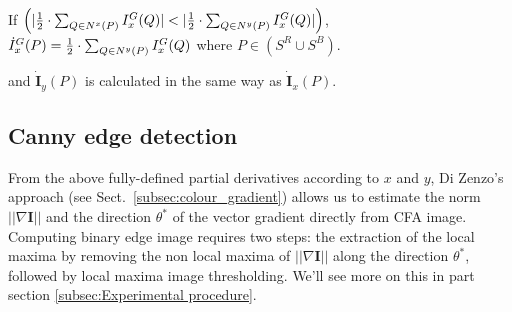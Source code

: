 \documentclass[twoside]{article}
\begin{document}
		
		If $\left(|\frac{1}{2}\cdot\sum_{Q \in \N{x}(P)} I^G_x(Q)|<|\frac{1}{2}\cdot\sum_{Q \in \N{y}(P)} I^G_x(Q)|\right)$, $\dot{I}^G_x(P)=\frac{1}{2}\cdot\sum_{Q \in N^{y}(P)} I^G_x(Q)$ where $P \in (S^R \cup S^B)$.
		
		
		

		\noindent and $\dot{\textbf{I}}_y(P)$ is calculated in the same way as $\dot{\textbf{I}}_x(P)$.  


				

		
		
	
	
	


\subsection{Canny edge detection}
\label{Canny edge detection}
From the above fully-defined partial derivatives according to $x$ and $y$, Di Zenzo's approach (see Sect.~\ref{subsec:colour_gradient}) allows us to estimate the norm $||\nabla \mathbf{I}||$ and the direction $\theta^{*}$ of the vector gradient directly from CFA image.
Computing binary edge image requires two steps: the extraction of the local maxima by removing the non local maxima of $||\nabla \mathbf{I}||$ along the direction $\theta^{*}$, followed by local maxima image thresholding. We'll see more on this in part section \ref{subsec:Experimental procedure}.     
\end{document}
